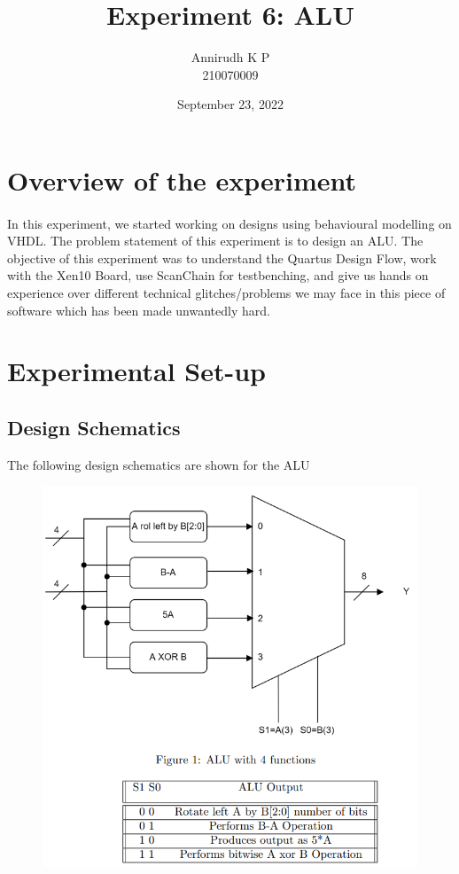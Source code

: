 \documentclass[12pt]{article}
\title{Experiment 6: ALU}
\author{Annirudh K P\\%
210070009}
\date{September 23, 2022}
\begin{document}
\maketitle

\section{Overview of the experiment}
\paragraph{}
In this experiment, we started working on designs using behavioural modelling on VHDL. The problem statement of this experiment is to design an ALU. The objective of this experiment was to understand the Quartus Design Flow, work with the Xen10 Board, use ScanChain for testbenching, and give us hands on experience over different technical glitches/problems we may face in this piece of software which has been made unwantedly hard.

\section{Experimental Set-up}

\subsection{Design Schematics}
The following design schematics are shown for the ALU 

\begin{figure}[H]
\centering
  \includegraphics[scale=0.3]{Images/ALU_Design.png}
  \caption{}
\end{figure}
\end{document}
